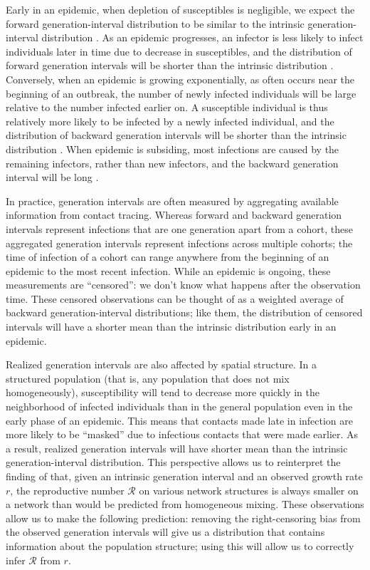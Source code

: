 \documentclass[12pt]{article}
\newcommand{\RR}{\ensuremath{{\mathcal R}}}
\begin{document}
Early in an epidemic, when depletion of susceptibles is negligible, we expect the forward generation-interval distribution to be similar to the intrinsic generation-interval distribution \citep{champredon2015intrinsic}.
As an epidemic progresses, an infector is less likely to infect individuals later in time due to decrease in susceptibles, 
and the distribution of forward generation intervals will be shorter than the intrinsic distribution \citep{kenah2008generation, tomba2010some, champredon2015intrinsic}.
Conversely, when an epidemic is growing exponentially, as often occurs near the beginning of an outbreak, the number of newly infected individuals will be large relative to the number infected earlier on. 
A susceptible individual is thus relatively more likely to be infected by a newly infected individual, 
and the distribution of backward generation intervals will be shorter than the intrinsic distribution \citep{champredon2015intrinsic, britton2019estimation}.
When epidemic is subsiding, most infections are caused by the remaining infectors, rather than new infectors, and the backward generation interval will be long \citep{tomba2010some, champredon2015intrinsic}.

In practice, generation intervals are often measured by aggregating available information from contact tracing. 
Whereas forward and backward generation intervals represent infections that are one generation apart from a cohort, these aggregated generation intervals represent infections across multiple cohorts; 
the time of infection of a cohort can range anywhere from the beginning of an epidemic to the most recent infection.
While an epidemic is ongoing, these measurements are ``censored'': we don't know what happens after the observation time.
These censored observations can be thought of as a weighted average of backward generation-interval distributions;
like them, the distribution of censored intervals will have a shorter mean than the intrinsic distribution early in an epidemic.

Realized generation intervals are also affected by spatial structure.
In a structured population (that is, any population that does not mix homogeneously), susceptibility will tend to decrease more quickly in the neighborhood of infected individuals than in the general population even in the early phase of an epidemic. 
This means that contacts made late in infection are more likely to be ``masked'' due to infectious contacts that were made earlier.
As a result, realized generation intervals will have shorter mean than the intrinsic generation-interval distribution.
This perspective allows us to reinterpret the finding of \cite{trapman2016inferring} that, given an intrinsic generation interval and an observed growth rate $r$, the reproductive number $\RR$ on various network structures is always smaller on a network than would be predicted from homogeneous mixing.
These observations allow us to make the following prediction: removing the right-censoring bias from the observed generation intervals will give us a distribution that contains information about the population structure; using this will allow us to correctly infer $\RR$ from $r$.
\end{document}
